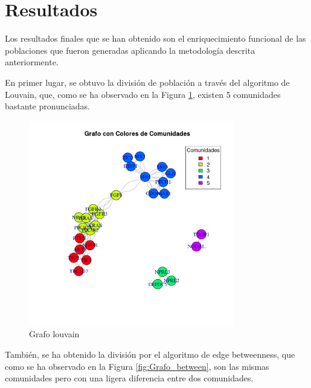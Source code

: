 \section{Resultados}

Los resultados finales que se han obtenido son el enriquecimiento funcional de las poblaciones que fueron generadas aplicando la metodología descrita anteriormente.

En primer lugar, se obtuvo la división de población a través del algoritmo de Louvain, que, como se ha observado en la Figura \ref{fig:Grafo_louvain}, existen 5 comunidades bastante pronunciadas.

\begin{figure}[!]
	\centering
	\includegraphics[width=0.8\textwidth]{figures/grafo_colores_comunidades.png}
	\caption{Grafo louvain}
	\label{fig:Grafo_louvain}
\end{figure}

También, se ha obtenido la división por el algoritmo de edge betweenness, que como se ha observado en la Figura \ref{fig:Grafo_between}, son las mismas comunidades pero con una ligera diferencia entre dos comunidades.

